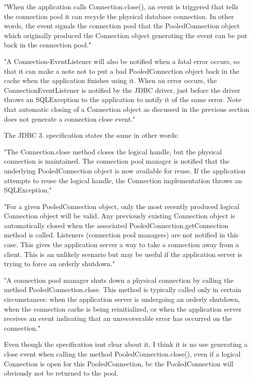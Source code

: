 "When the application calls Connection.\+close(), an event is triggered that tells the connection pool it can recycle the physical database connection. In other words, the event signals the connection pool that the Pooled\+Connection object which originally produced the Connection object generating the event can be put back in the connection pool." 

"A Connection-\/\+Event\+Listener will also be notified when a fatal error occurs, so that it can make a note not to put a bad Pooled\+Connection object back in the cache when the application finishes using it. When an error occurs, the Connection\+Event\+Listener is notified by the J\+D\+BC driver, just before the driver throws an S\+Q\+L\+Exception to the application to notify it of the same error. Note that automatic closing of a Connection object as discussed in the previous section does not generate a connection close event." 

The J\+D\+BC 3. specification states the same in other words\+:

"The Connection.\+close method closes the logical handle, but the physical connection is maintained. The connection pool manager is notified that the underlying Pooled\+Connection object is now available for reuse. If the application attempts to reuse the logical handle, the Connection implementation throws an S\+Q\+L\+Exception." 

"For a given Pooled\+Connection object, only the most recently produced logical Connection object will be valid. Any previously existing Connection object is automatically closed when the associated Pooled\+Connection.\+get\+Connection method is called. Listeners (connection pool managers) are not notified in this case. This gives the application server a way to take a connection away from a client. This is an unlikely scenario but may be useful if the application server is trying to force an orderly shutdown." 

"A connection pool manager shuts down a physical connection by calling the method Pooled\+Connection.\+close. This method is typically called only in certain circumstances\+: when the application server is undergoing an orderly shutdown, when the connection cache is being reinitialized, or when the application server receives an event indicating that an unrecoverable error has occurred on the connection." 

Even though the specification isn\textquotesingle{}t clear about it, I think it is no use generating a close event when calling the method Pooled\+Connection.\+close(), even if a logical Connection is open for this Pooled\+Connection, bc the Pooled\+Connection will obviously not be returned to the pool. 

